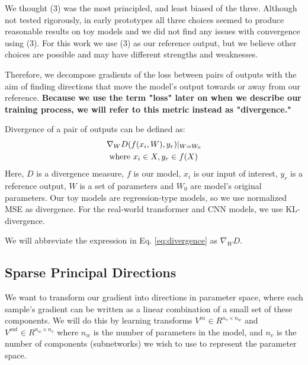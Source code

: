 \documentclass{article}
\theoremstyle{plain}
\theoremstyle{definition}
\theoremstyle{remark}
\begin{document}
We thought (3) was the most principled, and least biased of the three. Although not tested rigorously, in early prototypes all three choices seemed to produce reasonable results on toy models and we did not find any issues with convergence using (3). For this work we use (3) as our reference output, but we believe other choices are possible and may have different strengths and weaknesses.

Therefore, we  decompose gradients of the loss between pairs of outputs with the aim of finding directions that move the model's output towards or away from our reference. \textbf{Because we use the term "loss" later on when we describe our training process, we will refer to this metric instead as "divergence."}

Divergence of a pair of outputs can be defined as:
\begin{align}\label{eq:divergence}
    &\nabla_W D(f(x_i, W), y_r)|_{W=W_0} \\
    &\text{ where } x_i \in X  ,  y_r \in f(X)\notag
\end{align}
Here, $D$ is a divergence measure, $f$ is our model, $x_i$ is our input of interest, $y_r$ is a reference output, $W$ is a set of parameters and $W_0$ are model's original parameters. Our toy models are regression-type models, so we use normalized MSE as divergence. For the real-world transformer and CNN models, we use KL-divergence.

We will abbreviate the expression in Eq. \ref{eq:divergence} as $\nabla_W D$.

\subsection{Sparse Principal Directions}\label{subsec:decomposition}

We want to transform our gradient into directions in parameter space, where each sample's gradient can be written as a linear combination of a small set of these components. We will do this by learning transforms $V^{in} \in R^{n_v \times n_w}$ and $V^{out} \in R^{n_w \times n_v}$ where $n_w$ is the number of parameters in the model, and $n_v$ is the number of components (subnetworks) we wish to use to represent the parameter space.
\end{document}
